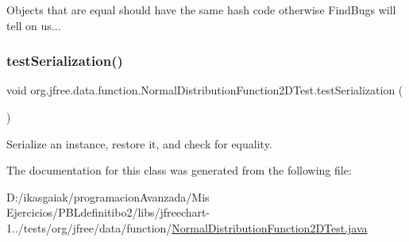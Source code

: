 Objects that are equal should have the same hash code otherwise Find\+Bugs will tell on us... \mbox{\label{classorg_1_1jfree_1_1data_1_1function_1_1_normal_distribution_function2_d_test_a49e93081a07d18475d0ddcc204c02c10}} 
\subsubsection{\texorpdfstring{test\+Serialization()}{testSerialization()}}
{\footnotesize\ttfamily void org.\+jfree.\+data.\+function.\+Normal\+Distribution\+Function2\+D\+Test.\+test\+Serialization (\begin{DoxyParamCaption}{ }\end{DoxyParamCaption})}

Serialize an instance, restore it, and check for equality. 

The documentation for this class was generated from the following file\+:\begin{DoxyCompactItemize}
\item 
D\+:/ikasgaiak/programacion\+Avanzada/\+Mis Ejercicios/\+P\+B\+Ldefinitibo2/libs/jfreechart-\/1../tests/org/jfree/data/function/\mbox{\hyperlink{_normal_distribution_function2_d_test_8java}{Normal\+Distribution\+Function2\+D\+Test.\+java}}\end{DoxyCompactItemize}

